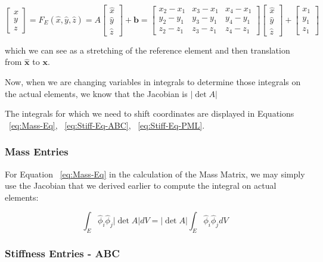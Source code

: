 \begin{equation}
\label{eq:transform}
\begin{bmatrix}
x \\
y \\
z
\end{bmatrix}
= F_E(\hat{x}, \hat{y}, \hat{z}) = A \begin{bmatrix}
\hat{x} \\ 
\hat{y} \\ 
\hat{z}
\end{bmatrix} + \boldsymbol{b}
= \begin{bmatrix}
x_2-x_1 & x_3-x_1 & x_4-x_1 \\
y_2-y_1 & y_3-y_1 & y_4-y_1 \\
z_2-z_1 & z_3-z_1 & z_4-z_1
\end{bmatrix} \begin{bmatrix}
\hat{x} \\
\hat{y} \\
\hat{z}
\end{bmatrix} + \begin{bmatrix}
x_1 \\
y_1 \\
z_1
\end{bmatrix}
\end{equation}

which we can see as a stretching of the reference element and then translation from $\boldsymbol{\hat{x}}$ to $\boldsymbol{x}$.

Now, when we are changing variables in integrals to determine those integrals on the actual elements, we know that the Jacobian is $|\det A|$


The integrals for which we need to shift coordinates are displayed in Equations ~\ref{eq:Mass-Eq}, ~\ref{eq:Stiff-Eq-ABC}, ~\ref{eq:Stiff-Eq-PML}.

\subsubsection{Mass Entries}

For Equation ~\ref{eq:Mass-Eq} in the calculation of the Mass Matrix, we may simply use the Jacobian that we derived earlier to compute the integral on actual elements:

\begin{equation}
\int_E \hat{\phi}_i \hat{\phi}_j |\det A| dV = |\det A| \int_E \hat{\phi}_i \hat{\phi}_j dV 
\end{equation}

\subsubsection{Stiffness Entries - ABC}

